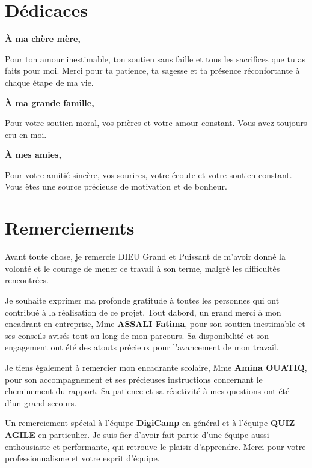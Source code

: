 \documentclass[12pt,a4paper,twoside]{report}
\begin{document}
\setcounter{page}{1}

\tableofcontents
\newpage

\chapter{Dédicaces}

\textbf{À ma chère mère,}

Pour ton amour inestimable, ton soutien sans faille et tous les
sacrifices que tu as faits pour moi. Merci pour ta patience, ta sagesse
et ta présence réconfortante à chaque étape de ma vie.

\textbf{À ma grande famille,}

Pour votre soutien moral, vos prières et votre amour constant. Vous avez
toujours cru en moi.

\textbf{À mes amies,}

Pour votre amitié sincère, vos sourires, votre écoute et votre soutien
constant. Vous êtes une source précieuse de motivation et de bonheur.

\chapter{Remerciements}

Avant toute chose, je remercie DIEU Grand et Puissant de m'avoir donné la volonté et le courage de mener ce travail à son terme, malgré les difficultés rencontrées.

Je souhaite exprimer ma profonde gratitude à toutes les personnes qui
ont contribué à la réalisation de ce projet. Tout
d\textquotesingle abord, un grand merci à mon encadrant en entreprise,
Mme \textbf{ASSALI Fatima}, pour son soutien inestimable et ses conseils
avisés tout au long de mon parcours. Sa disponibilité et son engagement
ont été des atouts précieux pour l'avancement de mon travail.

Je tiens également à remercier mon encadrante scolaire, Mme
\textbf{Amina OUATIQ}, pour son accompagnement et ses précieuses
instructions concernant le cheminement du rapport. Sa patience et sa
réactivité à mes questions ont été d'un grand secours.

Un remerciement spécial à l'équipe \textbf{DigiCamp} en général et à
l'équipe \textbf{QUIZ AGILE} en particulier. Je suis fier d'avoir fait
partie d'une équipe aussi enthousiaste et performante, qui retrouve le
plaisir d'apprendre. Merci pour votre professionnalisme et votre esprit
d'équipe.
\end{document}

